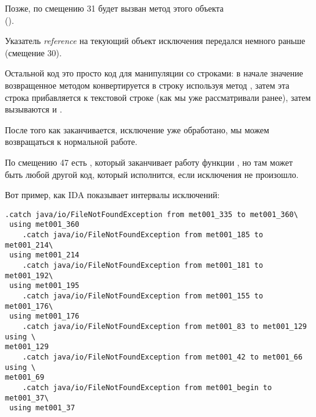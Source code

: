 Позже, по смещению 31 будет вызван метод этого объекта \\
().

Указатель \emph{reference} на текующий объект исключения передался немного раньше (смещение 30).

Остальной код это просто код для манипуляции со строками: 
в начале значение возвращенное методом 
конвертируется в строку используя метод , 
затем эта строка прибавляется к текстовой строке
 (как мы уже рассматривали ранее),
затем вызываются  и .

После того как  заканчивается, исключение уже обработано, мы можем
возвращаться к нормальной работе.

По смещению 47 есть , который заканчивает работу функции \main, 
но там может быть любой другой код, который исполнится, если исключения не произошло.

Вот пример, как IDA показывает интервалы исключений:

\begin{lstlisting}[caption=из какого-то случайного найденного на компьютере автора .class-файла]
    .catch java/io/FileNotFoundException from met001_335 to met001_360\
 using met001_360
    .catch java/io/FileNotFoundException from met001_185 to met001_214\
 using met001_214
    .catch java/io/FileNotFoundException from met001_181 to met001_192\
 using met001_195
    .catch java/io/FileNotFoundException from met001_155 to met001_176\
 using met001_176
    .catch java/io/FileNotFoundException from met001_83 to met001_129 using \
met001_129
    .catch java/io/FileNotFoundException from met001_42 to met001_66 using \
met001_69
    .catch java/io/FileNotFoundException from met001_begin to met001_37\
 using met001_37
\end{lstlisting}

